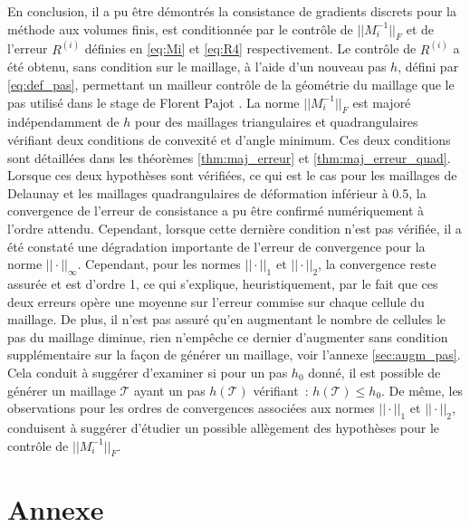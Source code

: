 \documentclass[12pt,a4paper]{article}
\begin{document}
En conclusion, il a pu être démontrés la consistance de gradients discrets pour la méthode aux volumes finis, est conditionnée par le contrôle de $|\!|M_i^{-1}|\!|_F$ et de l'erreur $R^{(i)}$ définies en \eqref{eq:Mi} et \eqref{eq:R4} respectivement. Le contrôle de $R^{(i)}$ a été obtenu, sans condition sur le maillage, à l'aide d'un nouveau pas $h$, défini par \eqref{eq:def_pas}, permettant un mailleur contrôle de la géométrie du maillage que le pas utilisé dans le stage de Florent Pajot \cite{florent}. La norme $|\!|M_i^{-1}|\!|_F$ est majoré indépendamment de $h$ pour des maillages triangulaires et quadrangulaires vérifiant deux conditions de convexité et d'angle minimum. Ces deux conditions sont détaillées dans les théorèmes \ref{thm:maj_erreur} et \ref{thm:maj_erreur_quad}. Lorsque ces deux hypothèses sont vérifiées, ce qui est le cas pour les maillages de Delaunay et les maillages quadrangulaires de déformation inférieur à 0.5, la convergence de l'erreur de consistance a pu être confirmé numériquement à l'ordre attendu. Cependant, lorsque cette dernière condition n'est pas vérifiée, il a été constaté une dégradation importante de l'erreur de convergence pour la norme $|\!|\cdot|\!|_\infty$. Cependant, pour les normes $|\!|\cdot|\!|_1$ et $|\!|\cdot|\!|_2$, la convergence reste assurée et est d'ordre 1, ce qui s'explique, heuristiquement, par le fait que ces deux erreurs opère une moyenne sur l'erreur commise sur chaque cellule du maillage. De plus, il n'est pas assuré qu'en augmentant le nombre de cellules le pas du maillage diminue, rien n'empêche ce dernier d'augmenter sans condition supplémentaire sur la façon de générer un maillage, voir l'annexe \ref{sec:augm_pas}. Cela conduit à suggérer d'examiner si pour un pas $h_0$ donné, il est possible de générer un maillage $\mathcal T$ ayant un pas $h(\mathcal T)$ vérifiant : $h(\mathcal T) \leq h_0$. De même, les observations pour les ordres de convergences associées aux normes $|\!|\cdot|\!|_1$ et $|\!|\cdot|\!|_2$, conduisent à suggérer d'étudier un possible allègement des hypothèses pour le contrôle de $|\!|M_i^{-1}|\!|_F$.

\section{Annexe}
\end{document}
